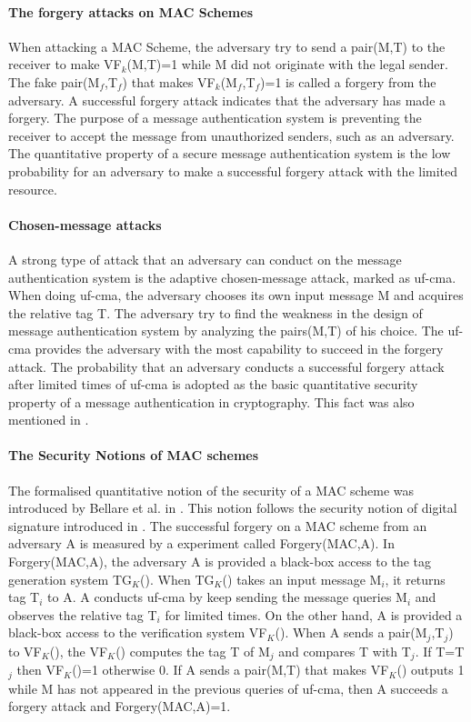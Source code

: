 \documentclass{article}
\begin{document}
\paragraph{The forgery attacks on MAC Schemes}
When attacking a MAC Scheme, the adversary try to send a pair(M,T) to the receiver to make VF$_k$(M,T)=1 while M did not originate with the legal sender. The fake pair(M$_f$,T$_f$) that makes VF$_k$(M$_f$,T$_f$)=1 is called a forgery from the adversary. A successful forgery attack indicates that the adversary has made a forgery. 
The purpose of a message authentication system is preventing the receiver to accept the message from unauthorized senders, such as an adversary. The quantitative property of a secure message authentication system is the low probability for an adversary to make a successful forgery attack with the limited resource.
\paragraph{Chosen-message attacks}
A strong type of attack that an adversary can conduct on the message authentication system is the adaptive chosen-message attack, marked as uf-cma. When doing uf-cma, the adversary chooses its own input message M and acquires the relative tag T. The adversary try to find the weakness in the design of message authentication system by analyzing the pairs(M,T) of his choice. The uf-cma provides the adversary with the most capability to succeed in the forgery attack. The probability that an adversary conducts a successful forgery attack after limited times of uf-cma is adopted as the basic quantitative security property of a message authentication in cryptography. This fact was also mentioned in \cite{Rogaway2011}.
\paragraph{The Security Notions of MAC schemes}
The formalised quantitative notion of the security of a MAC scheme was introduced by Bellare et al. in \cite{cbc1994}. This notion follows the security notion of digital signature introduced in \cite{signature}. The successful forgery on a MAC scheme from an adversary A is measured by a experiment called Forgery(MAC,A). In Forgery(MAC,A),  
the adversary A is provided a black-box access to the tag generation system TG$_K$(). When TG$_K$() takes an input message M$_i$, it returns tag T$_i$ to A. A conducts uf-cma by keep sending the message queries M$_i$ and observes the relative tag T$_i$ for limited times. On the other hand, A is provided a black-box access to the verification system VF$_K$(). When A sends a pair(M$_j$,T$_j$) to VF$_K$(), the VF$_K$() computes the tag T of M$_j$ and compares T with T$_j$. If T=T$_j$ then VF$_K$()=1 otherwise 0. If A sends a pair(M,T) that makes VF$_K$() outputs 1 while M has not appeared in the previous queries of uf-cma, then A succeeds a forgery attack and Forgery(MAC,A)=1.
\end{document}

